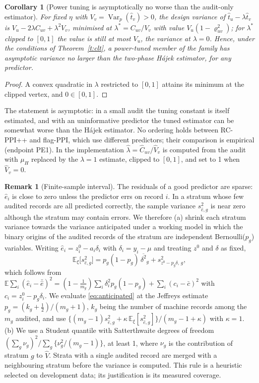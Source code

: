 \documentclass[11pt]{article}
\newtheorem{corollary}{Corollary}
\theoremstyle{definition}
\newtheorem{remark}{Remark}
\newcommand{\E}{\mathbb{E}}
\newcommand{\Var}{\operatorname{Var}}
\newcommand{\muH}{\mu_H}
\begin{document}
\begin{corollary}[Power tuning is asymptotically no worse than the audit-only estimator]\label{c:tune}
For fixed $\eta$ with $V_v=\Var_p(\hat t_{v})>0$, the design variance of
$\hat t_u-\lambda\hat t_v$ is $V_u-2\lambda C_{uv}+\lambda^2V_v$, minimised at
$\lambda^\ast=C_{uv}/V_v$ with value $V_u(1-\varrho_{uv}^2)$; for $\lambda^\ast$ clipped to
$[0,1]$ the value is still at most $V_u$, the variance at $\lambda=0$. Hence, under the
conditions of Theorem~\ref{t:clt}, a power-tuned member of the family has asymptotic
variance no larger than the two-phase H\'ajek estimator, for any predictor.
\end{corollary}
\begin{proof}
A convex quadratic in $\lambda$ restricted to $[0,1]$ attains its minimum at the clipped
vertex, and $0\in[0,1]$.
\end{proof}
The statement is asymptotic: in a small audit the tuning constant is itself estimated,
and with an uninformative predictor the tuned estimator can be somewhat worse than the
H\'ajek estimator. No ordering holds between RC-PPI++ and flag-PPI, which use different
predictors; their comparison is empirical (endpoint PE1). In the implementation
$\hat\lambda=\hat C_{uv}/\hat V_v$ is computed from the audit with $\muH$ replaced by the
$\lambda=1$ estimate, clipped to $[0,1]$, and set to 1 when $\hat V_v=0$.

\begin{remark}[Finite-sample interval]\label{r:interval}
The residuals of a good predictor are sparse: $\hat e_i$ is close to zero unless the
predictor errs on record $i$. In a stratum whose few audited records are all predicted
correctly, the sample variance $s^2_{\hat e,g}$ is near zero although the stratum may
contain errors. We therefore (a) shrink each stratum variance towards the variance
anticipated under a working model in which the binary origins of the audited records of
the stratum are independent Bernoulli($p_g$) variables. Writing
$\hat e_i=z^0_i-a_i\delta_i$ with $\delta_i=y_i-\hat\mu$ and treating $z^0$ and $\delta$ as
fixed,
\begin{equation}\label{eq:anticipated}
\E_\xi\big[s^2_{\hat e,g}\big]=p_g(1-p_g)\,\overline{\delta^2}_g+s^2_{z^0-p_g\delta,\,g},
\end{equation}
which follows from $\E\sum_i(\hat e_i-\bar{\hat e})^2=(1-\tfrac1{m_g})\sum_i\delta_i^2p_g(1-p_g)
+\sum_i(c_i-\bar c)^2$ with $c_i=z^0_i-p_g\delta_i$. We evaluate \eqref{eq:anticipated} at the
Jeffreys estimate $p_g=(k_g+\tfrac12)/(m_g+1)$, $k_g$ being the number of machine records
among the $m_g$ audited, and use
$\{(m_g-1)s^2_{\hat e,g}+\kappa\,\E_\xi[s^2_{\hat e,g}]\}/(m_g-1+\kappa)$ with $\kappa=1$.
(b) We use a Student quantile with Satterthwaite degrees of freedom
$(\sum_g\nu_g)^2\big/\sum_g\{\nu_g^2/(m_g-1)\}$, at least 1, where $\nu_g$ is the
contribution of stratum $g$ to $\hat V$. Strata with a single audited record are merged
with a neighbouring stratum before the variance is computed. This rule is a heuristic
selected on development data; its justification is its measured coverage.
\end{remark}
\end{document}
